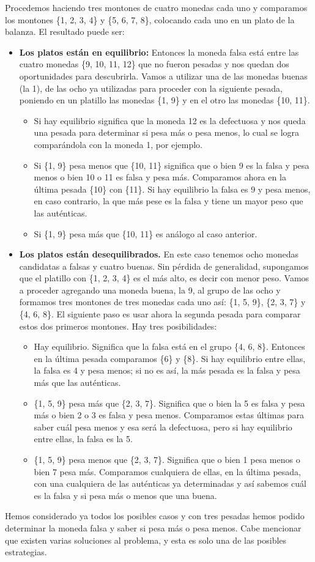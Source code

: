 Procedemos haciendo tres montones de cuatro monedas cada uno y comparamos los montones \{1, 2, 3, 4\} y \{5, 6, 7, 8\}, colocando cada uno en un plato de la balanza. El resultado puede ser:

\begin{itemize}
    \item \textbf{Los platos están en equilibrio:} Entonces la moneda falsa está entre las cuatro monedas \{9, 10, 11, 12\} que no fueron pesadas y nos quedan dos oportunidades para descubrirla. Vamos a utilizar una de las monedas buenas (la 1), de las ocho ya utilizadas para proceder con la siguiente pesada, poniendo en un platillo las monedas \{1, 9\} y en el otro las monedas \{10, 11\}.
    \begin{itemize}
        \item Si hay equilibrio significa que la moneda 12 es la defectuosa y nos queda una pesada para determinar si pesa más o pesa menos, lo cual se logra comparándola con la moneda 1, por ejemplo.
        \item Si \{1, 9\} pesa menos que \{10, 11\} significa que o bien 9 es la falsa y pesa menos o bien 10 o 11 es falsa y pesa más. Comparamos ahora en la última pesada \{10\} con \{11\}. Si hay equilibrio la falsa es 9 y pesa menos, en caso contrario, la que más pese es la falsa y tiene un mayor peso que las auténticas.
        \item Si \{1, 9\} pesa más que \{10, 11\} es análogo al caso anterior.
    \end{itemize}
    \item \textbf{Los platos están desequilibrados.} En este caso tenemos ocho monedas candidatas a falsas y cuatro buenas. Sin pérdida de generalidad, supongamos que el platillo con \{1, 2, 3, 4\} es el más alto, es decir con menor peso. Vamos a proceder agregando una moneda buena, la 9, al grupo de las ocho y formamos tres montones de tres monedas cada uno así: \{1, 5, 9\}, \{2, 3, 7\} y \{4, 6, 8\}. El siguiente paso es usar ahora la segunda pesada para comparar estos dos primeros montones. Hay tres posibilidades:
    \begin{itemize}
        \item Hay equilibrio. Significa que la falsa está en el grupo \{4, 6, 8\}. Entonces en la última pesada comparamos \{6\} y \{8\}. Si hay equilibrio entre ellas, la falsa es 4 y pesa menos; si no es así, la más pesada es la falsa y pesa más que las auténticas.
        \item \{1, 5, 9\} pesa más que \{2, 3, 7\}. Significa que o bien la 5 es falsa y pesa más o bien 2 o 3 es falsa y pesa menos. Comparamos estas últimas para saber cuál pesa menos y esa será la defectuosa, pero si hay equilibrio entre ellas, la falsa es la 5.
        \item \{1, 5, 9\} pesa menos que \{2, 3, 7\}. Significa que o bien 1 pesa menos o bien 7 pesa más. Comparamos cualquiera de ellas, en la última pesada, con una cualquiera de las auténticas ya determinadas y así sabemos cuál es la falsa y si pesa más o menos que una buena.
    \end{itemize}
\end{itemize}

Hemos considerado ya todos los posibles casos y con tres pesadas hemos podido determinar la moneda falsa y saber si pesa más o pesa menos. Cabe mencionar que existen varias soluciones al problema, y esta es solo una de las posibles estrategias.
